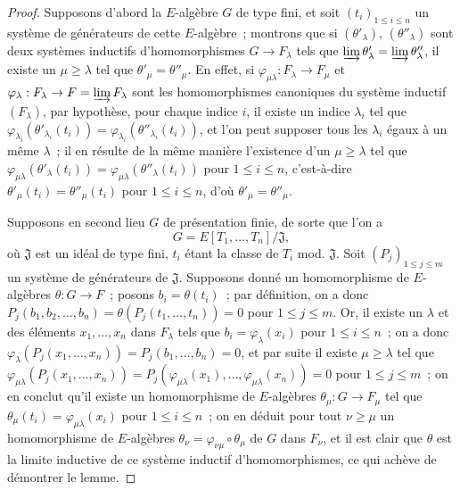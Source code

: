 \begin{proof}
Supposons d'abord la $E$-algèbre $G$ de type fini, et soit
$(t_i)_{1\leq i\leq n}$ un système de générateurs de cette $E$-algèbre~;
montrons que si $(\theta'_\lambda)$, $(\theta''_\lambda)$ sont deux systèmes
inductifs d'homomorphismes $G\to F_\lambda$ tels que
$\varinjlim\theta'_\lambda=\varinjlim\theta''_\lambda$, il existe un
$\mu\geq\lambda$ tel que $\theta'_\mu=\theta''_\mu$. En effet, si
$\varphi_{\mu\lambda}:F_\lambda\to F_\mu$ et
$\varphi_\lambda:F_\lambda\to F=\varinjlim F_\lambda$ sont les
homomorphismes canoniques du système inductif $(F_\lambda)$, par hypothèse,
pour chaque indice $i$, il existe un indice $\lambda_i$ tel que
$\varphi_{\lambda_i}(\theta'_{\lambda_i}(t_i))=
\varphi_{\lambda_i}(\theta''_{\lambda_i}(t_i))$, et l'on peut supposer tous
les $\lambda_i$ égaux à un même $\lambda$~; il en résulte de la même manière
l'existence d'un $\mu\geq\lambda$ tel que
$\varphi_{\mu\lambda}(\theta'_\lambda(t_i))=
\varphi_{\mu\lambda}(\theta''_\lambda(t_i))$ pour $1\leq i\leq n$,
c'est-à-dire $\theta'_\mu(t_i)=\theta''_\mu(t_i)$ pour $1\leq i\leq n$,
d'où $\theta'_\mu=\theta''_\mu$.

Supposons en second lieu $G$ de présentation finie, de sorte que l'on a
\[
G=E[T_1,\ldots,T_n]/\mathfrak J,
\]
où $\mathfrak J$ est un idéal de type fini, $t_i$ étant la classe de $T_i$
mod. $\mathfrak J$. Soit $(P_j)_{1\leq j\leq m}$ un système de générateurs de
$\mathfrak J$. Supposons donné un homomorphisme de $E$-algèbres
$\theta:G\to F$~; posons $b_i=\theta(t_i)$~; par définition, on a donc
$P_j(b_1,b_2,\ldots,b_n)=\theta(P_j(t_1,\ldots,t_n))=0$ pour
$1\leq j\leq m$. Or, il existe un $\lambda$ et des éléments
$x_1,\ldots,x_n$ dans $F_\lambda$ tels que $b_i=\varphi_\lambda(x_i)$ pour
$1\leq i\leq n$~; on a donc
$\varphi_\lambda(P_j(x_1,\ldots,x_n))=P_j(b_1,\ldots,b_n)=0$, et par suite il
existe $\mu\geq\lambda$ tel que
$\varphi_{\mu\lambda}(P_j(x_1,\ldots,x_n))=
P_j(\varphi_{\mu\lambda}(x_1),\ldots,\varphi_{\mu\lambda}(x_n))=0$ pour
$1\leq j\leq m$~; on en conclut qu'il existe un homomorphisme de
$E$-algèbres $\theta_\mu:G\to F_\mu$ tel que
$\theta_\mu(t_i)=\varphi_{\mu\lambda}(x_i)$
pour $1\leq i\leq n$~; on en déduit pour tout $\nu\geq\mu$ un
homomorphisme de $E$-algèbres
$\theta_\nu=\varphi_{\nu\mu}\circ\theta_\mu$ de $G$ dans $F_\nu$, et il est
clair que $\theta$ est la limite inductive de ce système inductif
d'homomorphismes, ce qui achève de démontrer le lemme.


\end{proof}
